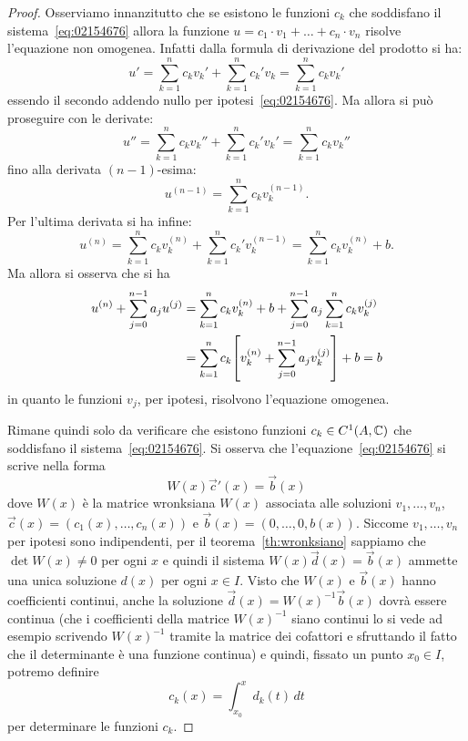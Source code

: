 \begin{proof}
Osserviamo innanzitutto che se esistono le funzioni $c_k$ che
soddisfano il sistema~\eqref{eq:02154676} allora la funzione $u = c_1
\cdot v_1 + \dots + c_n \cdot v_n$ risolve l'equazione non
omogenea. Infatti dalla formula di derivazione del prodotto si ha:
\[
  u' = \sum_{k=1}^n c_k v_k' + \sum_{k=1}^n c_k' v_k
     = \sum_{k=1}^n c_k v_k'
\]
essendo il secondo addendo nullo per ipotesi~\eqref{eq:02154676}.
Ma allora si può proseguire con le derivate:
\[
  u'' = \sum_{k=1}^n c_k v_k'' + \sum_{k=1}^n c_k' v_k'
      = \sum_{k=1}^n c_k v_k''
\]
fino alla derivata $(n-1)$-esima:
\[
  u^{(n-1)} = \sum_{k=1}^n c_k v_k^{(n-1)}.
\]
Per l'ultima derivata si ha infine:
\[
  u^{(n)} = \sum_{k=1}^n c_k v_k^{(n)} + \sum_{k=1}^n c_k' v_k^{(n-1)}
          = \sum_{k=1}^n c_k v_k^{(n)} + b.
\]
Ma allora si osserva che si ha
\begin{align*}
 u^{(n)} + \sum_{j=0}^{n-1} a_j u^{(j)}
 &= \sum_{k=1}^n c_k v_k^{(n)} + b + \sum_{j=0}^{n-1} a_j \sum_{k=1}^n c_k v_k^{(j)} \\
 &= \sum_{k=1}^n c_k {\left[ v_k^{(n)} + \sum_{j=0}^{n-1} a_j v_k^{(j)} \right]} + b = b
\end{align*}
 in quanto le funzioni $v_j$, per ipotesi, risolvono l'equazione omogenea.

 Rimane quindi solo da verificare che esistono funzioni $c_k\in
 C^1(A,\mathbb C)$ che soddisfano il sistema~\eqref{eq:02154676}.
 Si osserva che l'equazione~\eqref{eq:02154676} si scrive nella forma
 \[
   W(x) \vec c'(x) = \vec b(x)
 \]
 dove $W(x)$ è la matrice wronksiana $W(x)$ associata
 alle soluzioni $v_1, \dots, v_n$, $\vec c(x) = (c_1(x), \dots,
 c_n(x))$ e $\vec b(x) = (0, \dots, 0, b(x))$.
 Siccome $v_1, \dots, v_n$ per ipotesi sono indipendenti,
 per il teorema~\ref{th:wronksiano}
 sappiamo che
 $\det W(x)\neq 0$ per ogni $x$ e quindi il sistema $W(x) \vec d(x) =
 \vec b(x)$
 ammette una unica soluzione $d(x)$ per ogni $x\in I$.
 Visto che $W(x)$ e $\vec b(x)$ hanno coefficienti continui,
 anche la soluzione $\vec d(x) = W(x)^{-1} \vec b(x)$ dovrà essere continua (che i coefficienti della matrice $W(x)^{-1}$ siano continui lo si vede ad esempio scrivendo $W(x)^{-1}$ tramite la matrice dei cofattori e sfruttando il fatto che il determinante è una funzione continua)
 e quindi, fissato un punto $x_0\in I$,
 potremo definire
 \[
   c_k(x) = \int_{x_0}^x d_k(t)\, dt
 \]
 per determinare le funzioni $c_k$.
\end{proof}

